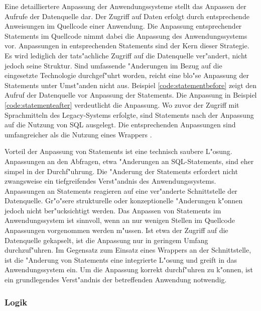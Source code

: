 Eine detailliertere Anpassung der Anwendungssysteme stellt das Anpassen der Aufrufe der Datenquelle dar. Der Zugriff auf Daten erfolgt durch entsprechende Anweisungen im Quellcode einer Anwendung. Die Anpassung entsprechender Statements im Quellcode nimmt dabei die Anpassung des Anwendungssystems vor. Anpassungen in entsprechenden Statements sind der Kern dieser Strategie. Es wird lediglich der tats"achliche Zugriff auf die Datenquelle ver"andert, nicht jedoch seine Struktur. Sind umfassende "Anderungen im Bezug auf die eingesetzte Technologie durchgef"uhrt worden, reicht eine blo"se Anpassung der Statements unter Umst"anden nicht aus.
\lb
Beispiel \ref{code:statementbefore} zeigt den Aufruf der Datenquelle vor Anpassung der Statements. Die Anpassung in Beispiel \ref{code:statementeafter} verdeutlicht die Anpassung. Wo zuvor der Zugriff mit Sprachmitteln des Legacy-Systems erfolgte, sind Statements nach der Anpassung auf die Nutzung von SQL ausgelegt. Die entsprechenden Anpassungen sind umfangreicher als die Nutzung eines Wrappers \citep{henrard-2002}.



\newpage



Vorteil der Anpassung von Statements ist eine technisch saubere L"osung. Anpassungen an den Abfragen, etwa "Anderungen an SQL-Statements, sind eher simpel in der Durchf"uhrung. Die "Anderung der Statements erfordert nicht zwangsweise ein tiefgreifendes Verst"andnis des Anwendungssystems. 
\lb
Anpassungen an Statements reagieren auf eine ver"anderte Schnittstelle der Datenquelle. Gr"o"sere strukturelle oder konzeptionelle "Anderungen k"onnen jedoch nicht ber"ucksichtigt werden.
\lb
Das Anpassen von Statements im Anwendungssystem ist sinnvoll, wenn an nur wenigen Stellen im Quellcode Anpassungen vorgenommen werden m"ussen. Ist etwa der Zugriff auf die Datenquelle gekapselt, ist die Anpassung nur in geringem Umfang durchzuf"uhren. Im Gegensatz zum Einsatz eines Wrappers an der Schnittstelle, ist die "Anderung von Statements eine integrierte L"osung und greift in das Anwendungssystem ein. Um die Anpassung korrekt durchf"uhren zu k"onnen, ist ein grundlegendes Verst"andnis der betreffenden Anwendung notwendig.

\subsubsection{Logik}

